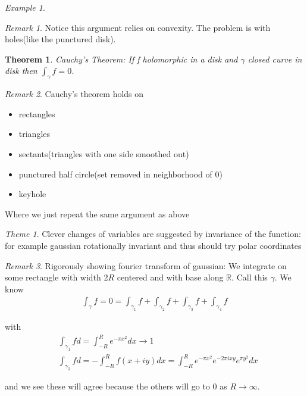 \documentclass[11pt]{article}
\newcommand{\R}{\mathbb{R}}
\newtheorem{theorem}{Theorem}
\theoremstyle{remark}
\newtheorem{remark}{Remark}
\newtheorem{theme}{Theme}
\newtheorem{example}{Example}
\begin{document}
\begin{example}
\begin{remark}
	Notice this argument relies on convexity. The problem is with holes(like the punctured disk).
\end{remark}

\begin{theorem}
	\textit{Cauchy's Theorem}: If f holomorphic in a disk and $\gamma$ closed curve in disk then $\int_{\gamma} f = 0$. 
\end{theorem}

\begin{remark}
	Cauchy's theorem holds on 
	\begin{itemize}
		\item rectangles
		\item triangles
		\item sectants(triangles with one side smoothed out)
		\item punctured half circle(set removed in neighborhood of 0)
		\item keyhole
	\end{itemize}

	Where we just repeat the same argument as above
\end{remark}



\begin{theme}
	Clever changes of variables are suggested by invariance of the function: for example gaussian rotationally invariant and thus should try polar coordinates
\end{theme}

\begin{remark}
	Rigorously showing fourier transform of gaussian:
	We integrate on some rectangle with width $2R$ centered and with base along $\R$. Call this $\gamma$. We know
	\begin{align*}
		\int_{\gamma} f = 0 = \int_{\gamma_1} f+ \int_{\gamma_2} f + \int_{\gamma_3} f + \int_{\gamma_4} f
	\end{align*}

	with 
	\begin{align*}
		&\int_{\gamma_1} f d = \int_{-R}^R e^{-\pi x^2}dx \to 1\\
		&\int_{\gamma_3} f d = -\int_{-R}^R f(x+iy)dx = \int_{-R}^R e^{-\pi x^2}e^{-2 \pi i xy}e^{\pi y^2} dx
	\end{align*}

	and we see these will agree because the others will go to 0 as $R \to \infty$. 
\end{remark}


\end{example}
\end{document}

